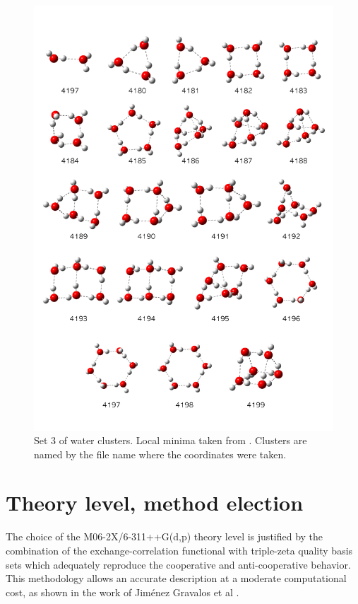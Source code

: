 \begin{figure}[h!p]
  \centering
  \includegraphics[width=1\textwidth]{4/plots/dibujitos/set3}
  \caption{Set 3 of water clusters. Local minima taken from \citet{Temelso2011}.
  Clusters are named by the file name where the coordinates were taken.}
  \label{Set3}
\end{figure}

\newpage

\section{Theory level, method election}\label{SecTheory}

The choice of the M06-2X/6-311++G(d,p) theory level is justified by the
combination of the exchange-correlation functional with triple-zeta quality
basis sets which adequately reproduce the cooperative and anti-cooperative
behavior.  This methodology allows an accurate description at a moderate
computational cost, as shown in the work of Jiménez Gravalos et al
.

